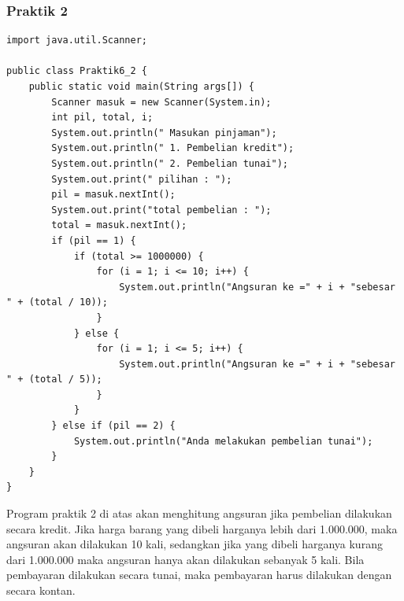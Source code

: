 \documentclass[a4paper,12pt]{article}
\begin{document}
\subsubsection{Praktik 2}
\begin{lstlisting}
import java.util.Scanner;

public class Praktik6_2 {
    public static void main(String args[]) {
        Scanner masuk = new Scanner(System.in);
        int pil, total, i;
        System.out.println(" Masukan pinjaman");
        System.out.println(" 1. Pembelian kredit");
        System.out.println(" 2. Pembelian tunai");
        System.out.print(" pilihan : ");
        pil = masuk.nextInt();
        System.out.print("total pembelian : ");
        total = masuk.nextInt();
        if (pil == 1) {
            if (total >= 1000000) {
                for (i = 1; i <= 10; i++) {
                    System.out.println("Angsuran ke =" + i + "sebesar " + (total / 10));
                }
            } else {
                for (i = 1; i <= 5; i++) {
                    System.out.println("Angsuran ke =" + i + "sebesar " + (total / 5));
                }
            }
        } else if (pil == 2) {
            System.out.println("Anda melakukan pembelian tunai");
        }
    }
}
\end{lstlisting}
Program praktik 2 di atas akan menghitung angsuran jika pembelian dilakukan secara kredit. Jika harga barang yang dibeli harganya lebih dari 1.000.000, maka angsuran akan dilakukan
10 kali, sedangkan jika yang dibeli harganya kurang dari 1.000.000 maka angsuran hanya akan dilakukan sebanyak 5 kali. Bila pembayaran dilakukan secara tunai, maka pembayaran harus dilakukan
dengan secara kontan.
\end{document}
